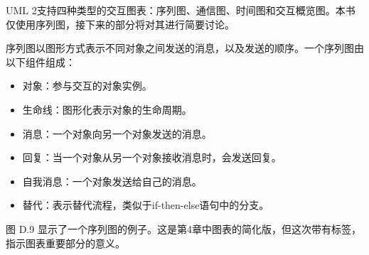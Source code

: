 
UML 2支持四种类型的交互图表：序列图、通信图、时间图和交互概览图。本书仅使用序列图，接下来的部分将对其进行简要讨论。


序列图以图形方式表示不同对象之间发送的消息，以及发送的顺序。一个序列图由以下组件组成：

\begin{itemize}
\item
对象：参与交互的对象实例。

\item
生命线：图形化表示对象的生命周期。

\item
消息：一个对象向另一个对象发送的消息。

\item
回复：当一个对象从另一个对象接收消息时，会发送回复。

\item
自我消息：一个对象发送给自己的消息。

\item
替代：表示替代流程，类似于if-then-else语句中的分支。
\end{itemize}

图 D.9 显示了一个序列图的例子。这是第4章中图表的简化版，但这次带有标签，指示图表重要部分的意义。









